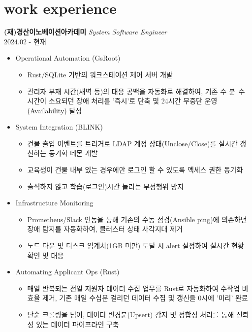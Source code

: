 \documentclass[10pt, a4paper]{article}
\newcommand{\descstyle}{\lightfont\fontsize{9.5pt}{10pt}\selectfont}
\newcommand{\jobtitle}[2]{{\normalsize\textbf{#1}} \hfill {\descstyle\textit{#2}}}
\newcommand{\dates}[1]{\hfill {\descstyle\color{lightGray} #1}}
\begin{document}
\hfill
\begin{minipage}[t]{0.62\textwidth} %

    \section*{\huge{work experience}}
    
    \jobtitle{(재)경산이노베이션아카데미}{System Software Engineer} \\
    \dates{2024.02 - 현재}
    \begin{itemize}[label=\textbullet] 
        \descstyle 
        \item Operational Automation (GsRoot)
        \begin{itemize}
            \item Rust/SQLite 기반의 워크스테이션 제어 서버 개발
            \item 관리자 부재 시간(새벽 등)의 대응 공백을 자동화로 해결하여, 기존 수 분~수 시간이 소요되던 장애 처리를 '즉시'로 단축 및 24시간 무중단 운영(Availability) 달성
        \end{itemize}
        
        \item System Integration (BLINK)
        \begin{itemize}
            \item 건물 출입 이벤트를 트리거로 LDAP 계정 상태(Unclose/Close)를 실시간 갱신하는 동기화 데몬 개발
            \item 교육생이 건물 내부 있는 경우에만 로그인 할 수 있도록 엑세스 권한 동기화
            \item 출석하지 않고 학습(로그인)시간 늘리는 부정행위 방지
        \end{itemize}
        
        \item Infrastructure Monitoring
        \begin{itemize}
            \item Prometheus/Slack 연동을 통해 기존의 수동 점검(Ansible ping)에 의존하던 장애 탐지를 자동화하여, 클러스터 상태 사각지대 제거
            \item 노드 다운 및 디스크 임계치(1GB 미만) 도달 시 alert 설정하여 실시간 현황 확인 및 대응
            
        \end{itemize}
        
        \item Automating Applicant Ops (Rust)
        \begin{itemize}
            \item 매일 반복되는 전일 지원자 데이터 수집 업무를 Rust로 자동화하여 수작업 비효율 제거, 기존 매일 수십분 걸리던 데이터 수집 및 갱신을 0시에 '미리' 완료
            \item 단순 크롤링을 넘어, 데이터 변경분(Upsert) 감지 및 정합성 처리를 통해 신뢰성 있는 데이터 파이프라인 구축
        \end{itemize}


\end{itemize}
\end{minipage}
\end{document}
